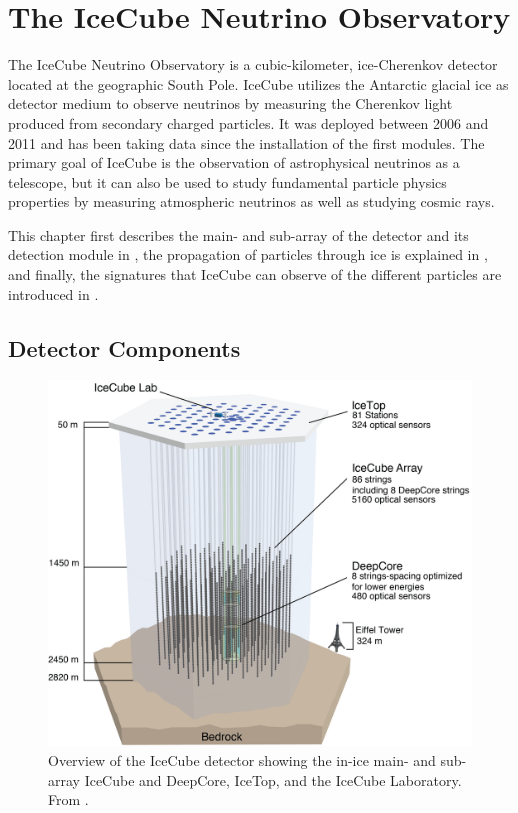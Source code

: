 \setchapterpreamble[u]{\margintoc}


\chapter{The IceCube Neutrino Observatory}

The IceCube Neutrino Observatory  is a cubic-kilometer, ice-Cherenkov detector located at the geographic South Pole. IceCube utilizes the Antarctic glacial ice as detector medium to observe neutrinos by measuring the Cherenkov light produced from secondary charged particles. It was deployed between 2006 and 2011 and has been taking data since the installation of the first modules. The primary goal of IceCube is the observation of astrophysical neutrinos as a telescope, but it can also be used to study fundamental particle physics properties by measuring atmospheric neutrinos as well as studying cosmic rays.

This chapter first describes the main- and sub-array of the detector and its detection module in , the propagation of particles through ice is explained in , and finally, the signatures that IceCube can observe of the different particles are introduced in .


\section{Detector Components} 

\begin{figure}[h]
    \includegraphics{figures/icecube_deepcore/IceCubeArray_slim.png}
	\caption[IceCube overview]{Overview of the IceCube detector showing the in-ice main- and sub-array IceCube and DeepCore, IceTop, and the IceCube Laboratory. From \cite{2017JInst..12P3012A_Instrumentation_Systems}.}
\end{figure}

